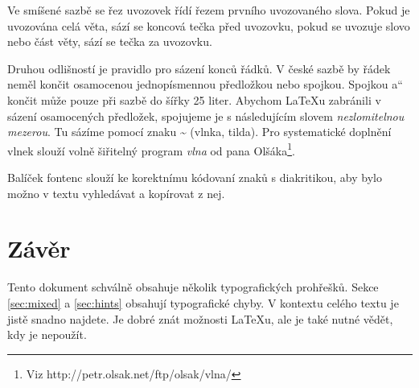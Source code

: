 \documentclass[a4paper,10pt,twocolumn]{article}
\newcommand{\mv}[1]{\quotedblbase#1\textquotedblleft}
\begin{document}
Ve smíšené sazbě se řez uvozovek řídí řezem prvního uvozovaného slova. Pokud je uvozována celá věta, sází se koncová tečka před uvozovku, pokud se uvozuje slovo nebo část věty, sází se tečka za uvozovku.

Druhou odlišností je pravidlo pro sázení konců řádků. V české sazbě by řádek neměl končit osamocenou jednopísmennou předložkou nebo spojkou. Spojkou \mv{a} končit může pouze při sazbě do šířky 25 liter. Abychom {\LaTeX}u zabránili v sázení osamocených předložek, spojujeme je s následujícím slovem \emph{nezlomitelnou mezerou}. Tu sázíme pomocí znaku {\bfseries \textasciitilde} (vlnka, tilda). Pro systematické doplnění vlnek slouží volně šiřitelný program \emph{vlna} od pana Olšáka\footnote[2]{Viz {\ttfamily http://petr.olsak.net/ftp/olsak/vlna/}}.

Balíček {\ttfamily fontenc} slouží ke korektnímu kódovaní znaků s diakritikou, aby bylo možno v textu vyhledávat a kopírovat z nej.

\section{Závěr}
\label{sec:end}

Tento dokument schválně obsahuje několik typografických prohřešků. Sekce \ref{sec:mixed} a \ref{sec:hints} obsahují typografické chyby. V kontextu celého textu je jistě snadno najdete. Je dobré znát možnosti {\LaTeX}u, ale je také nutné vědět, kdy je nepoužít.
\end{document}
